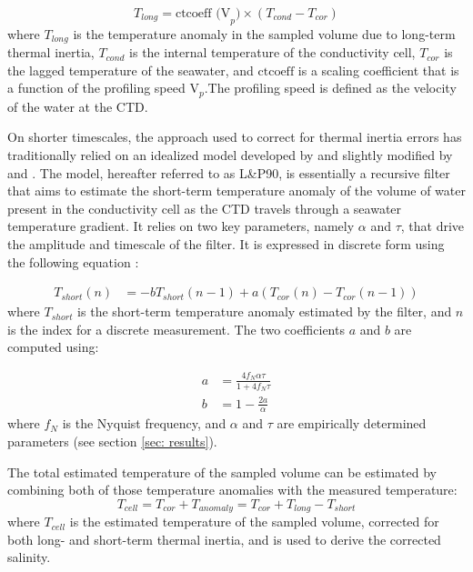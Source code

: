 \documentclass{ametsocV6.1}
\begin{document}
\begin{equation}
	T_{long} = \text{ctcoeff (V}_p) \times (T_{cond} - T_{cor})
	\label{eq: long-term_TM}
\end{equation}
where $T_{long}$ is the temperature anomaly in the sampled volume due to long-term thermal inertia, $T_{cond}$ is the internal temperature of the conductivity cell, $T_{cor}$ is the lagged temperature of the seawater, and $\text{ctcoeff}$ is a scaling coefficient that is a function of the profiling speed V$_p$.The profiling speed is defined as the velocity of the water at the CTD. 

On shorter timescales, the approach used to correct for thermal inertia errors has traditionally relied on an idealized model developed by \cite{Lueck_1990a} and slightly modified by \cite{Lueck_1990b} and \cite{Morison_1994}. 
The model, hereafter referred to as L\&P90, is essentially a recursive filter that aims to estimate the short-term temperature anomaly of the volume of water present in the conductivity cell as the CTD travels through a seawater temperature gradient. It relies on two key parameters, namely $\alpha$ and $\tau$, that drive the amplitude and timescale of the filter. It is expressed in discrete form using the following equation \citep{Morison_1994}:

\begin{align}
	\label{eq: LP}
	T_{short}(n) &= -b T_{short}(n-1) + a (T_{cor}(n) - T_{cor}(n-1))
\end{align}
where $T_{short}$ is the short-term temperature anomaly estimated by the filter, and $n$ is the index for a discrete measurement. The two coefficients $a$ and $b$ are computed using:

\begin{align}
	\label{eq: LP2}
	a &= \frac{4f_N\alpha\tau}{1+4f_N\tau}\nonumber\\
	b &= 1-\frac{2a}{\alpha}
\end{align}
where $f_N$ is the Nyquist frequency, and $\alpha$ and $\tau$ are empirically determined parameters (see section \ref{sec: results}).

The total estimated temperature of the sampled volume can be estimated by combining both of those temperature anomalies with the measured temperature:
\begin{equation}
T_{cell} = T_{cor} + T_{anomaly} = T_{cor} + T_{long} - T_{short} 
\end{equation}
where $T_{cell}$ is the estimated temperature of the sampled volume, corrected for both long- and short-term thermal inertia, and is used to derive the corrected salinity.
\end{document}
